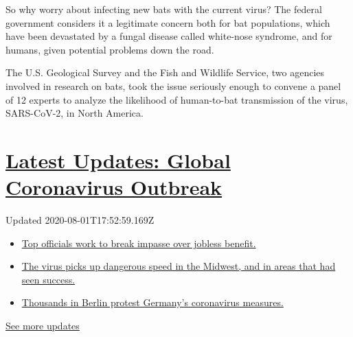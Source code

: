 So why worry about infecting new bats with the current virus? The
federal government considers it a legitimate concern both for bat
populations, which have been devastated by a fungal disease called
white-nose syndrome, and for humans, given potential problems down the
road.

The U.S. Geological Survey and the Fish and Wildlife Service, two
agencies involved in research on bats, took the issue seriously enough
to convene a panel of 12 experts to analyze the likelihood of
human-to-bat transmission of the virus, SARS-CoV-2, in North America.

\hypertarget{latest-updates-global-coronavirus-outbreak}{%
\section{\texorpdfstring{\href{https://www.nytimes.com/2020/08/01/world/coronavirus-covid-19.html?action=click\&pgtype=Article\&state=default\&region=MAIN_CONTENT_1\&context=storylines_live_updates}{Latest
Updates: Global Coronavirus
Outbreak}}{Latest Updates: Global Coronavirus Outbreak}}\label{latest-updates-global-coronavirus-outbreak}}

Updated 2020-08-01T17:52:59.169Z

\begin{itemize}
\tightlist
\item
  \href{https://www.nytimes.com/2020/08/01/world/coronavirus-covid-19.html?action=click\&pgtype=Article\&state=default\&region=MAIN_CONTENT_1\&context=storylines_live_updates\#link-3ac56579}{Top
  officials work to break impasse over jobless benefit.}
\item
  \href{https://www.nytimes.com/2020/08/01/world/coronavirus-covid-19.html?action=click\&pgtype=Article\&state=default\&region=MAIN_CONTENT_1\&context=storylines_live_updates\#link-8796723}{The
  virus picks up dangerous speed in the Midwest, and in areas that had
  seen success.}
\item
  \href{https://www.nytimes.com/2020/08/01/world/coronavirus-covid-19.html?action=click\&pgtype=Article\&state=default\&region=MAIN_CONTENT_1\&context=storylines_live_updates\#link-25930521}{Thousands
  in Berlin protest Germany's coronavirus measures.}
\end{itemize}

\href{https://www.nytimes.com/2020/08/01/world/coronavirus-covid-19.html?action=click\&pgtype=Article\&state=default\&region=MAIN_CONTENT_1\&context=storylines_live_updates}{See
more updates}

